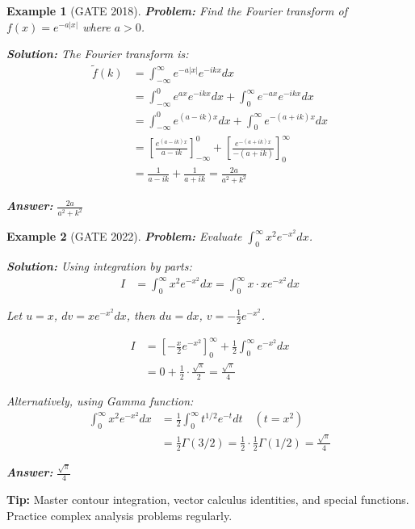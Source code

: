 \documentclass[12pt,a4paper]{article}
\newtheorem{example}{Example}[section]
\newcommand{\ans}[1]{\textcolor{red!70!black}{\textbf{Answer:} #1}}
\newcommand{\sol}{\textcolor{blue!70!black}{\textbf{Solution:}}}
\newcommand{\tip}[1]{\textcolor{green!60!black}{\textbf{Tip:} #1}}
\begin{document}
\begin{example}[GATE 2018]
\textbf{Problem:} Find the Fourier transform of $f(x) = e^{-a|x|}$ where $a > 0$.

\sol
The Fourier transform is:
\begin{align}
\tilde{f}(k) &= \int_{-\infty}^{\infty} e^{-a|x|} e^{-ikx} dx\\
&= \int_{-\infty}^{0} e^{ax} e^{-ikx} dx + \int_{0}^{\infty} e^{-ax} e^{-ikx} dx\\
&= \int_{-\infty}^{0} e^{(a-ik)x} dx + \int_{0}^{\infty} e^{-(a+ik)x} dx\\
&= \left[\frac{e^{(a-ik)x}}{a-ik}\right]_{-\infty}^{0} + \left[\frac{e^{-(a+ik)x}}{-(a+ik)}\right]_{0}^{\infty}\\
&= \frac{1}{a-ik} + \frac{1}{a+ik} = \frac{2a}{a^2 + k^2}
\end{align}

\ans{$\frac{2a}{a^2 + k^2}$}
\end{example}

\begin{example}[GATE 2022]
\textbf{Problem:} Evaluate $\int_0^{\infty} x^2 e^{-x^2} dx$.

\sol
Using integration by parts:
\begin{align}
I &= \int_0^{\infty} x^2 e^{-x^2} dx = \int_0^{\infty} x \cdot x e^{-x^2} dx
\end{align}

Let $u = x$, $dv = x e^{-x^2} dx$, then $du = dx$, $v = -\frac{1}{2}e^{-x^2}$.

\begin{align}
I &= \left[-\frac{x}{2}e^{-x^2}\right]_0^{\infty} + \frac{1}{2}\int_0^{\infty} e^{-x^2} dx\\
&= 0 + \frac{1}{2} \cdot \frac{\sqrt{\pi}}{2} = \frac{\sqrt{\pi}}{4}
\end{align}

Alternatively, using Gamma function:
\begin{align}
\int_0^{\infty} x^2 e^{-x^2} dx &= \frac{1}{2}\int_0^{\infty} t^{1/2} e^{-t} dt \quad (t = x^2)\\
&= \frac{1}{2}\Gamma(3/2) = \frac{1}{2} \cdot \frac{1}{2}\Gamma(1/2) = \frac{\sqrt{\pi}}{4}
\end{align}

\ans{$\frac{\sqrt{\pi}}{4}$}
\end{example}

\tip{Master contour integration, vector calculus identities, and special functions. Practice complex analysis problems regularly.}
\end{document}
